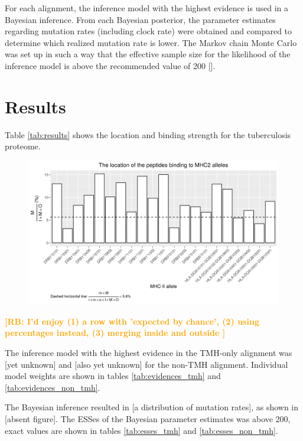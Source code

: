 \documentclass{article}
\newcommand{\richel}[1]{\textcolor{orange}{\textbf{[RB: #1]}}}
\begin{document}
For each alignment, the inference model with the highest evidence
is used in a Bayesian inference. From each Bayesian posterior,
the parameter estimates regarding mutation rates (including clock rate)
were obtained and compared to determine which realized mutation rate is lower.
The Markov chain Monte Carlo was set up in such a way that the effective sample
size for the likelihood of the inference model is above the recommended value
of 200 [\cite{bouckaert2014beast}].

\section{Results}

Table \ref{tab:results} shows the location and binding strength for the
tuberculosis proteome.

\begin{figure}[ht]
  \includegraphics[width=\textwidth]{figure_1.png}
  \label{fig:1}
\end{figure}


\richel{
  I'd enjoy 
  (1) a row with 'expected by chance', 
  (2) using percentages instead,
  (3) merging inside and outside
}

The inference model with the highest evidence in the
TMH-only alignment was [yet unknown] and [also yet unknown]
for the non-TMH alignment. Individual model weights are shown
in tables \ref{tab:evidences_tmh} 
and \ref{tab:evidences_non_tmh}.

The Bayesian inference resulted in [a distribution of mutation rates],
as shown in [absent figure].
The ESSes of the Bayesian parameter estimates was above 200, exact values
are shown in tables \ref{tab:esses_tmh} and \ref{tab:esses_non_tmh}.
\end{document}

